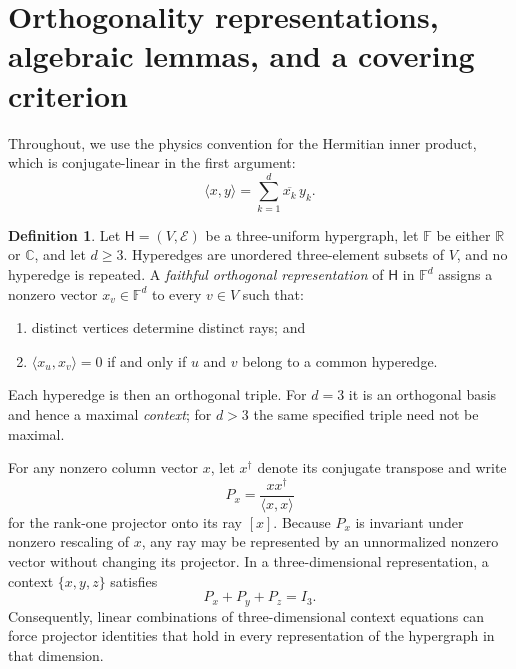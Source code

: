 \documentclass[twocolumn,aps,pra,floatfix,amsmath,amssymb,longbibliography]{revtex4-2}
\theoremstyle{definition}
\newtheorem{definition}[theorem]{Definition}
\theoremstyle{remark}
\newcommand{\C}{\mathbb C}
\newcommand{\R}{\mathbb R}
\begin{document}
\section{Orthogonality representations, algebraic lemmas, and a covering criterion}
\label{sec:prelim}

Throughout, we use the physics convention for the Hermitian inner product,
which is conjugate-linear in the first argument:
\begin{equation}
 \langle x,y\rangle=\sum_{k=1}^{d}\overline{x_k}\,y_k.
 \label{eq:inner-product}
\end{equation}

\begin{definition}
\label{def:for}
Let $\mathsf H=(V,\mathcal E)$ be a three-uniform hypergraph, let
$\mathbb F$ be either $\R$ or $\C$, and let $d\ge3$.
Hyperedges are unordered three-element subsets of $V$, and no hyperedge
is repeated.  A \emph{faithful orthogonal representation} of $\mathsf H$ in
$\mathbb F^d$ assigns a nonzero vector $x_v\in\mathbb F^d$ to every $v\in V$
such that:
\begin{enumerate}
\item distinct vertices determine distinct rays; and
\item $\langle x_u,x_v\rangle=0$ if and only if $u$ and $v$ belong to a
common hyperedge.
\end{enumerate}
Each hyperedge is then an orthogonal triple.  For $d=3$ it is an orthogonal
basis and hence a maximal \emph{context}; for $d>3$ the same specified triple
need not be maximal.
\end{definition}

For any nonzero column vector $x$, let $x^\dagger$ denote its conjugate
transpose and write
\begin{equation}
 P_x=\frac{xx^\dagger}{\langle x,x\rangle}
 \label{eq:projector}
\end{equation}
for the rank-one projector onto its ray $[x]$.  Because $P_x$ is invariant
under nonzero rescaling of $x$, any ray may be represented by an unnormalized
nonzero vector without changing its projector.  In a three-dimensional
representation, a context $\{x,y,z\}$ satisfies
\begin{equation}
 P_x+P_y+P_z=I_3.
 \label{eq:context-sum}
\end{equation}
Consequently, linear combinations of three-dimensional context equations can
force projector identities that hold in every representation of the hypergraph
in that dimension.
\end{document}
